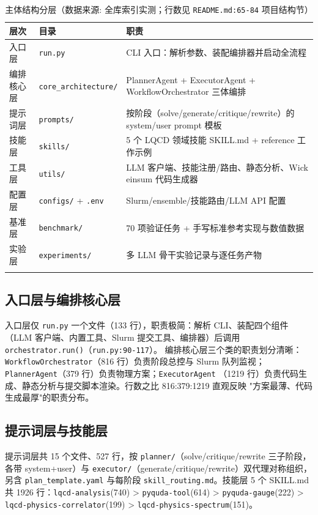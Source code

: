 \documentclass[UTF8]{ctexart}
\begin{document}
\begin{xltabular}{\textwidth}{llX}
\toprule
\textcolor{struct}{层次} & 目录 & \textcolor{struct}{职责} \\
\midrule
\endhead
入口层 & \texttt{run.py} & CLI 入口：解析参数、装配编排器并启动全流程 \\
编排核心层 & \texttt{core\_architecture/} & PlannerAgent + ExecutorAgent + WorkflowOrchestrator 三体编排 \\
提示词层 & \texttt{prompts/} & 按阶段（solve/generate/critique/rewrite）的 system/user prompt 模板 \\
技能层 & \texttt{skills/} & 5 个 LQCD 领域技能 SKILL.md + reference 工作示例 \\
工具层 & \texttt{utils/} & LLM 客户端、技能注册/路由、静态分析、Wick einsum 代码生成器 \\
配置层 & \texttt{configs/} + \texttt{.env} & Slurm/ensemble/技能路由/LLM API 配置 \\
基准层 & \texttt{benchmark/} & 70 项验证任务 + 手写标准参考实现与数值数据 \\
实验层 & \texttt{experiments/} & 多 LLM 骨干实验记录与逐任务产物 \\
\bottomrule
\caption{主体结构分层（数据来源: 全库索引实测；行数见 \texttt{README.md:65-84} 项目结构节）}
\end{xltabular}

\subsection{入口层与编排核心层}

入口层仅 \texttt{run.py} 一个文件（133 行），职责极简：解析 CLI、装配四个组件
（LLM 客户端、内置工具、Slurm 提交工具、编排器）后调用
\texttt{orchestrator.run()}（\texttt{\nolinkurl{run.py:90-117}}）。
编排核心层三个类的职责划分清晰：\texttt{WorkflowOrchestrator}（816 行）负责阶段总控与
Slurm 队列监视；\texttt{PlannerAgent}（379 行）负责物理方案；\texttt{ExecutorAgent}
（1219 行）负责代码生成、静态分析与提交脚本渲染。行数之比 816:379:1219 直观反映
"方案最薄、代码生成最厚"的职责分布。

\subsection{提示词层与技能层}

提示词层共 15 个文件、527 行，按 \texttt{planner/}（solve/critique/rewrite 三子阶段，各带
system+user）与 \texttt{executor/}（generate/critique/rewrite）双代理对称组织，另含
\texttt{plan\_template.yaml} 与每阶段 \texttt{skill\_routing.md}。技能层 5 个 SKILL.md 共
1926 行：\texttt{lqcd-analysis}(740) > \texttt{pyquda-tool}(614) > \texttt{pyquda-gauge}(222) >
\texttt{lqcd-physics-correlator}(199) > \texttt{lqcd-physics-spectrum}(151)。
\end{document}
